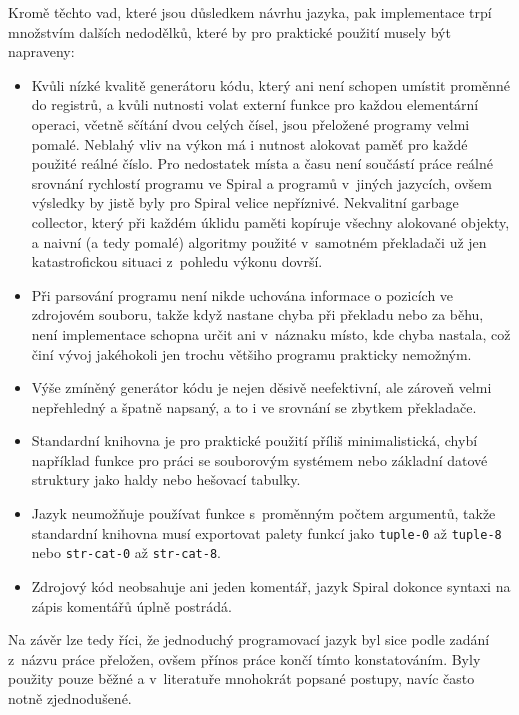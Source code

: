 Kromě těchto vad, které jsou důsledkem návrhu jazyka, pak implementace trpí
množstvím dalších nedodělků, které by pro praktické použití musely být
napraveny:

\begin{itemize}
  \item Kvůli nízké kvalitě generátoru kódu, který ani není schopen umístit
    proměnné do registrů, a kvůli nutnosti volat externí funkce pro každou
    elementární operaci, včetně sčítání dvou celých čísel, jsou přeložené programy
    velmi pomalé. Neblahý vliv na výkon má i nutnost alokovat paměť pro každé
    použité reálné číslo. Pro nedostatek místa a času není součástí práce reálné
    srovnání rychlostí programu ve Spiral a programů v~jiných jazycích, ovšem
    výsledky by jistě byly pro Spiral velice nepříznivé. Nekvalitní garbage
    collector, který při každém úklidu paměti kopíruje všechny alokované
    objekty, a naivní (a tedy pomalé) algoritmy použité v~samotném překladači už
    jen katastrofickou situaci z~pohledu výkonu dovrší.

  \item Při parsování programu není nikde uchována informace o pozicích ve
    zdrojovém souboru, takže když nastane chyba při překladu nebo za běhu, není
    implementace schopna určit ani v~náznaku místo, kde chyba nastala, což činí
    vývoj jakéhokoli jen trochu většiho programu prakticky nemožným.

  \item Výše zmíněný generátor kódu je nejen děsivě neefektivní, ale zároveň
    velmi nepřehledný a špatně napsaný, a to i ve srovnání se zbytkem
    překladače.

  \item Standardní knihovna je pro praktické použití příliš minimalistická,
    chybí například funkce pro práci se souborovým systémem nebo základní datové
    struktury jako haldy nebo hešovací tabulky.

  \item Jazyk neumožňuje používat funkce s~proměnným počtem argumentů, takže
    standardní knihovna musí exportovat palety funkcí jako \texttt{tuple-0} až
    \texttt{tuple-8} nebo \texttt{str-cat-0} až \texttt{str-cat-8}.
    
  \item Zdrojový kód neobsahuje ani jeden komentář, jazyk Spiral dokonce syntaxi
    na zápis komentářů úplně postrádá.
\end{itemize}

Na závěr lze tedy říci, že jednoduchý programovací jazyk byl sice podle zadání
z~názvu práce přeložen, ovšem přínos práce končí tímto konstatováním. Byly
použity pouze běžné a v~literatuře mnohokrát popsané postupy, navíc často notně
zjednodušené.

